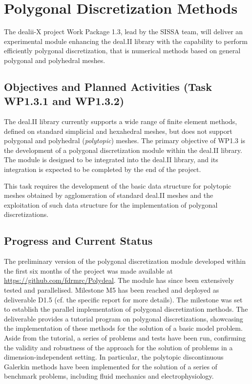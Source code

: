 \documentclass[a4paper,12pt]{article}
\begin{document}
\section{Polygonal Discretization Methods}

 The dealii-X project Work Package 1.3, lead by the SISSA team, will deliver an experimental module enhancing the
deal.II library with the capability to perform efficiently polygonal discretization, that is numerical methods based on general polygonal and polyhedral meshes.%

\subsection{Objectives and Planned Activities (Task WP1.3.1 and WP1.3.2)}

The deal.II library currently
supports a wide range of finite element methods, defined on standard simplicial
and hexahedral meshes, but does not support polygonal and polyhedral (\emph{polytopic}) meshes.
The primary objective of WP1.3 is the development of a polygonal
discretization module within the deal.II library. The module is designed to be integrated into the deal.II library, and its integration is expected to be completed by the end of the project.

This task requires the development of the basic data structure for polytopic meshes obtained by agglomeration of standard deal.II meshes and the exploitation of such data structure for the implementation of polygonal discretizations.


 \subsection{Progress and Current Status}

The preliminary version of the polygonal discretization module developed within the first six months of the project was made available at \url{https://github.com/fdrmrc/Polydeal}.
The module has since been extensively tested and parallelised. 
Milestone M5 has been reached and deployed as deliverable D1.5 (cf. the specific report for more details). The milestone was set to establish the parallel implementation of polygonal discretization methods. The deliverable provides a tutorial program on polygonal discretizations, showcasing the implementation of these methods for the solution of a basic model problem. Aside from the tutorial, a series of problems and tests have been run, confirming the validity and robustness of the approach for the solution of problems in a dimension-independent setting. In particular, the polytopic discontinuous Galerkin methods have been implemented for the solution of a series of benchmark problems, including fluid mechanics and electrophysiology.
\end{document}
